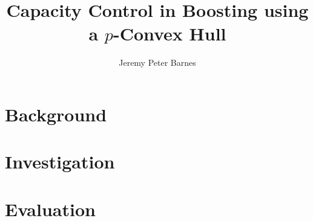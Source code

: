 \documentclass[a4paper,11pt,oneside]{book}
\title{Capacity Control in Boosting using a $p$-Convex Hull}
\author{Jeremy Peter Barnes}
\begin{document}
\frontmatter

\maketitle



\tableofcontents
\listoffigures
\listoftables

\renewcommand{\baselinestretch}{1.0}
\small\normalsize




\mainmatter



\thispagestyle{empty}\part{Background}\thispagestyle{empty}




\thispagestyle{empty}\part{Investigation}\thispagestyle{empty}




\thispagestyle{empty}\part{Evaluation}\thispagestyle{empty}




\appendix

\renewcommand{\baselinestretch}{1.0}
\small\normalsize






\backmatter



\end{document}
